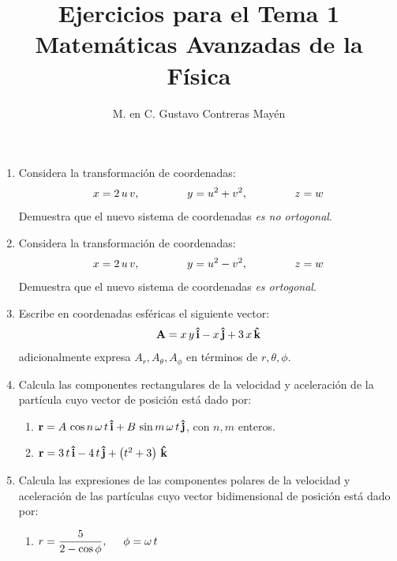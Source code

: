 \documentclass[12pt]{article}
\title{Ejercicios para el Tema 1 \\ \large{Matemáticas Avanzadas de la Física}}
\author{M. en C. Gustavo Contreras Mayén}
\date{ }
\begin{document}
\vspace{-4cm}

\maketitle
\fontsize{14}{14}\selectfont

\begin{enumerate}
\item Considera la transformación de coordenadas:
\begin{align*}
x = 2 \, u \, v, \hspace{1.5cm} y = u^{2} + v^{2}, \hspace{1.5cm} z = w
\end{align*}
Demuestra que el nuevo sistema de coordenadas \emph{es no ortogonal}.
\item Considera la transformación de coordenadas:
\begin{align*}
x = 2 \, u \, v, \hspace{1.5cm} y = u^{2} - v^{2}, \hspace{1.5cm} z = w
\end{align*}
Demuestra que el nuevo sistema de coordenadas \emph{es ortogonal}.
\item Escribe en coordenadas esféricas el siguiente vector:
\begin{align*}
\vb{A} = x \, y \, \vu{i} - x \, \vu{j} + 3 \, x \, \vu{k}
\end{align*}
adicionalmente expresa $A_{r}, A_{\theta}, A_{\phi}$ en términos de $r, \theta, \phi$.
\item Calcula las componentes rectangulares de la velocidad y aceleración de la partícula cuyo vector de posición está dado por:
\begin{enumerate}[label=\arabic{enumi}.\arabic*)]
\item $\vb{r} = A \, \cos n \, \omega \,  t \, \vu{i} + B \, \sin m \, \omega \, t \, \vu{j}$, con $n, m$ enteros.
\item $\vb{r} = 3 \, t \, \vu{i} - 4 \, t \, \vu{j} + \left( t^{2} + 3 \right) \, \vu{k}$
\end{enumerate}
\item Calcula las expresiones de las componentes polares de la velocidad y aceleración de las partículas cuyo vector bidimensional de posición está dado por:
\begin{enumerate}[label=\arabic{enumi}.\arabic*)]
\item $r = \dfrac{5}{2 - \cos \phi}, \hspace{0.5cm} \phi = \omega \, t$

\end{enumerate}
\end{enumerate}
\end{document}
